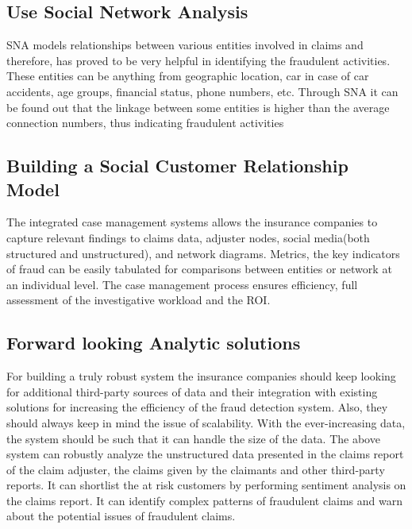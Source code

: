 \documentclass[sigconf]{acmart}
\begin{document}
\subsection{Use Social Network Analysis}
SNA models relationships between various entities involved in claims and therefore, has proved to be very helpful in identifying the fraudulent activities. These entities can be anything from geographic location, car in case of car accidents, age groups, financial status, phone numbers, etc. Through SNA it can be found out that the linkage between some entities is higher than the average connection numbers, thus indicating fraudulent activities
\subsection{Building a Social Customer Relationship Model}
The integrated case management systems allows the insurance companies to capture relevant findings to claims data, adjuster nodes, social media(both structured and unstructured), and network diagrams. Metrics, the key indicators of fraud can be easily tabulated for comparisons between entities or network at an individual level. The case management process ensures efficiency, full assessment of the investigative workload and the ROI.
\subsection{Forward looking Analytic solutions}
For building a truly robust system the insurance companies should keep looking for additional third-party sources of data and their integration with existing solutions for increasing the efficiency of the fraud detection system. Also, they should always keep in mind the issue of scalability. With the ever-increasing data, the system should be such that it can handle the size of the data.
The above system can robustly analyze the unstructured data presented in the claims report of the claim adjuster, the claims given by the claimants and other third-party reports. It can shortlist the at risk customers by performing sentiment analysis on the claims report. It can identify complex patterns of fraudulent claims and warn about the potential issues of fraudulent claims. \cite{link7}
\end{document}
